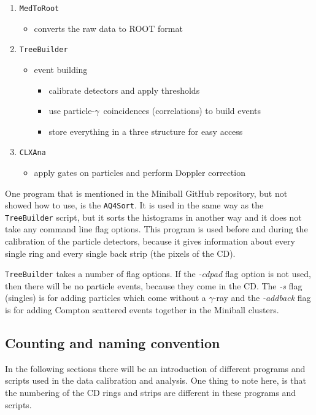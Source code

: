 \documentclass[twoside,english]{uiofysmaster/uiofysmaster}
\newcommand{\ga}{$\gamma$}
\begin{document}
\begin{enumerate}
	\item \texttt{MedToRoot}
	\begin{itemize}
		\item converts the raw data to ROOT format
	\end{itemize}
	\item \texttt{TreeBuilder}
	\begin{itemize}
		\item event building
		\begin{itemize}
			\item calibrate detectors and apply thresholds
			\item use particle-\ga\ coincidences (correlations) to build events
			\item store everything in a three structure for easy access
		\end{itemize}
	\end{itemize}
	\item \texttt{CLXAna}
	\begin{itemize}
		\item apply gates on particles and perform Doppler correction
	\end{itemize}
\end{enumerate}

One program that is mentioned in the Miniball GitHub repository, but not showed how to use, is the \texttt{AQ4Sort}. It is used in the same way as the \texttt{TreeBuilder} script, but it sorts the histograms in another way and it does not take any command line flag options. 
This program is used before and during the calibration of the particle detectors, because it gives information about every single ring and every single back strip (the pixels of the CD). 

\texttt{TreeBuilder} takes a number of flag options. If the \textit{-cdpad} flag option is not used, then there will be no particle events, because they come in the CD. The \textit{-s} flag (singles) is for adding particles which come without a \ga-ray and the \textit{-addback} flag is for adding Compton scattered events together in the Miniball clusters.


\subsection{Counting and naming convention}
In the following sections there will be an introduction of different programs and scripts used in the data calibration and analysis. One thing to note here, is that the numbering of the CD rings and strips are different in these programs and scripts. 
\end{document}
